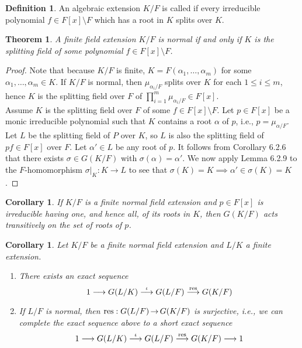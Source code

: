 \documentclass[11pt]{book}
\newcounter{counter}
\newtheorem{theorem}[counter]{Theorem}   \newtheorem*{theorem*}{Theorem}   \newtheorem{lemma}[counter]{Lemma}   \newtheorem{corollary}[counter]{Corollary}
\theoremstyle{definition}   \newtheorem{defn}[counter]{Definition} %
\newcommand{\bs}{\setminus}   \newcommand{\A}{\mathcal{A}}   \newcommand{\sy}{\textnormal{Syl}}   \newcommand{\size}[1]{\left| #1 \right|}
\DeclareMathOperator{\ra}{\rightarrow}   \DeclareMathOperator{\Poly}{\mathbf{P}}   \DeclareMathOperator{\spn}{\textnormal{span}}   \DeclareMathOperator{\aut}{\textnormal{Aut}}
\newcommand{\vs}{\vspace{8pt}}   \newcommand{\hs}{\hspace{8pt}}
\numberwithin{counter}{chapter}
\begin{document}
\begin{defn}
An algebraic extension $K/F$ is called  if every irreducible polynomial $f \in F[x] \bs F$ which has a root in $K$ splits over $K$. 
\end{defn}

\vs

\begin{theorem}
A finite field extension $K/F$ is normal if and only if $K$ is the splitting field of some polynomial $f \in F[x] \bs F$. 
\end{theorem}

\begin{proof}
Note that because $K/F$ is finite, $K = F(\alpha_1,\dots,\alpha_m)$ for some $\alpha_1,\dots,\alpha_m \in K$. If $K/F$ is normal, then $\mu_{\alpha_i/F}$ splits over $K$ for each $1 \leq i \leq m$, hence $K$ is the splitting field over $F$ of $\prod_{i=1}^m \mu_{\alpha_i/F} \in F[x]$. \\

Assume $K$ is the splitting field over $F$ of some $f \in F[x] \bs F$. Let $p \in F[x]$ be a monic irreducible polynomial such that $K$ contains a root $\alpha$ of $p$, i.e., $p = \mu_{\alpha/F}$. Let $L$ be the splitting field of $P$ over $K$, so $L$ is also the splitting field of $pf \in F[x]$ over $F$. Let $\alpha' \in L$ be any root of $p$. It follows from Corollary 6.2.6 that there exists $\sigma \in G(K/F)$ with $\sigma(\alpha) = \alpha'$. We now apply Lemma 6.2.9 to the $F$-homomorphism $\sigma|_K : K \ra L$ to see that $\sigma(K) = K \implies \alpha' \in \sigma(K) = K$. 
\end{proof}

\vs

\begin{corollary}
If $K/F$ is a finite normal field extension and $p \in F[x]$ is irreducible having one, and hence all, of its roots in $K$, then $G(K/F)$ acts transitively on the set of roots of $p$. 
\end{corollary}

\vs

\begin{corollary}
Let $K/F$ be a finite normal field extension and $L/K$ a finite extension.
\begin{enumerate}
\item[(a)] There exists an exact sequence 
	\[1 \longrightarrow G(L/K) \overset{\iota}{\longrightarrow} G(L/F) \overset{\textnormal{res}}{\longrightarrow} G(K/F) \]

\item[(b)] If $L/F$ is normal, then $\tn{res} : G(L/F) \ra G(K/F)$ is surjective, i.e., we can complete the exact sequence above to a short exact sequence
\[1 \longrightarrow G(L/K) \overset{\iota}{\longrightarrow} G(L/F) \overset{\textnormal{res}}{\longrightarrow} G(K/F) \longrightarrow 1 \]
\end{enumerate}
\end{corollary}
\end{document}
